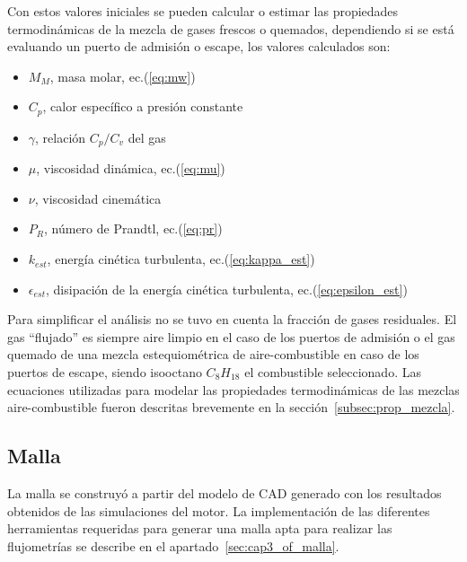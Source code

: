 Con estos valores iniciales se pueden calcular o estimar las propiedades
termodinámicas de la mezcla de gases frescos o quemados, dependiendo si se está
evaluando un puerto de admisión o escape, los valores calculados son:
%
\begin{itemize}
    \item $M_{M}$, masa molar, ec.(\ref{eq:mw})
    \item $C_{p}$, calor específico a presión constante
    \item $\gamma$, relación $C_{p}/C_{v}$ del gas
    \item $\mu$, viscosidad dinámica, ec.(\ref{eq:mu})
    \item $\nu$, viscosidad cinemática
    \item $P_{R}$, número de Prandtl, ec.(\ref{eq:pr})
    \item $k_{est}$, energía cinética turbulenta, ec.(\ref{eq:kappa_est})
    \item $\epsilon_{est}$, disipación de la energía cinética turbulenta, ec.(\ref{eq:epsilon_est})
\end{itemize}



Para simplificar el análisis no se tuvo en cuenta la fracción de gases
residuales.
%
El gas ``flujado'' es siempre aire limpio en el caso de los puertos
de admisión o el gas quemado de una mezcla estequiométrica de aire-combustible
en caso de los puertos de escape, siendo isooctano $C_{8}H_{18}$ el combustible
seleccionado.
%
Las ecuaciones utilizadas para modelar las propiedades termodinámicas de las
mezclas aire-combustible fueron descritas brevemente en la
sección~\ref{subsec:prop_mezcla}.

\subsection{Malla}

La malla se construyó a partir del modelo de CAD generado con los resultados
obtenidos de las simulaciones del motor.
%
La implementación de las diferentes herramientas requeridas para generar una
malla apta para realizar las flujometrías se describe en el
apartado~\ref{sec:cap3_of_malla}.


